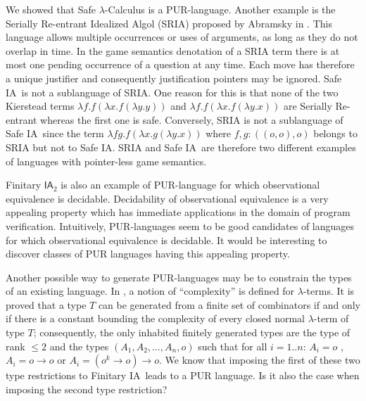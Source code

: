 \documentclass{llncs}
\newcommand\ialgol{\textsf{IA}}
\begin{document}
We showed that Safe $\lambda$-Calculus is a PUR-language. Another
example is the Serially Re-entrant Idealized Algol (SRIA) proposed
by Abramsky  in \cite{abramsky:mchecking_ia}. This language allows
multiple occurrences or uses of arguments, as long as they do not
overlap in time. In the game semantics denotation of a SRIA term
there is at most one pending occurrence of a question at any time.
Each move has therefore a unique justifier and consequently
justification pointers may be ignored. Safe \ialgol\ is not a
sublanguage of SRIA. One reason for this is that none of the two
Kierstead terms $\lambda f . f (\lambda x . f (\lambda y .y ))$ and
$\lambda f . f (\lambda x . f (\lambda y .x ))$ are Serially
Re-entrant whereas the first one is safe. Conversely, SRIA is not a
sublanguage of Safe \ialgol\ since the term $\lambda f g. f (\lambda
x . g (\lambda y .x ))$ where $f,g:((o,o),o)$ belongs to SRIA but
not to Safe \ialgol. SRIA and Safe \ialgol\ are therefore two
different examples of languages with pointer-less game semantics.

Finitary $\ialgol_2$ is also an example of PUR-language for which
observational equivalence is decidable. Decidability of observational equivalence is a very
appealing property which has immediate applications in the domain of
program verification. Intuitively, PUR-languages seem to be good
candidates of languages for which observational equivalence is
decidable. It would be interesting to discover classes of PUR
languages having this appealing property.

Another possible way to generate PUR-languages may be to constrain
the types of an existing language. In \cite{DBLP:conf/tlca/Joly01},
a notion of ``complexity'' is defined for $\lambda$-terms. It is
proved that a type $T$ can be generated from a finite set of
combinators if and only if there is a constant bounding the
complexity of every closed normal $\lambda$-term of type $T$;
consequently, the only inhabited finitely generated types are the
type of rank $\leq 2$ and the types $(A_1, A_2, \ldots, A_n, o)$
such that for all $i = 1..n$: $A_i = o$ , $A_i = o \rightarrow o$ or
$A_i = (o^k \rightarrow o) \rightarrow o$. We know that imposing the
first of these two type restrictions to Finitary \ialgol\ leads to a
PUR language. Is it also the case when imposing the second type
restriction?




\end{document}

